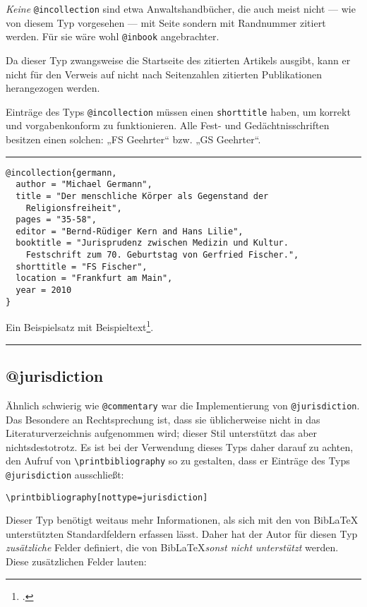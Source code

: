 \documentclass[11pt,a4paper,DIV=calc]{scrartcl}
\newcommand\software[1]{\textsf{#1}}
\newcommand\Biblatex{\software{Bib\LaTeX{}}\xspace}
\newenvironment{rubexample}{\par\vspace{\baselineskip}\hrule\par\begin{refsection}}{\end{refsection}\par\hrule\par\vspace{\baselineskip}}
\begin{document}
\emph{Keine} \verb+@incollection+ sind etwa Anwaltshandbücher, die
auch meist nicht — wie von diesem Typ vorgesehen — mit Seite sondern
mit Randnummer zitiert werden. Für sie wäre wohl \verb+@inbook+
angebrachter.

Da dieser Typ zwangsweise die Startseite des zitierten Artikels
ausgibt, kann er nicht für den Verweis auf nicht nach Seitenzahlen
zitierten Publikationen herangezogen werden.

Einträge des Typs \verb+@incollection+ müssen einen \verb+shorttitle+
haben, um korrekt und vorgabenkonform zu funktionieren. Alle Fest- und
Gedächtnisschriften besitzen einen solchen: „FS Geehrter“ bzw. „GS
Geehrter“.

\begin{rubexample}
\begin{verbatim}
@incollection{germann,
  author = "Michael Germann",
  title = "Der menschliche Körper als Gegenstand der
    Religionsfreiheit",
  pages = "35-58",
  editor = "Bernd-Rüdiger Kern and Hans Lilie",
  booktitle = "Jurisprudenz zwischen Medizin und Kultur.
    Festschrift zum 70. Geburtstag von Gerfried Fischer.",
  shorttitle = "FS Fischer",
  location = "Frankfurt am Main",
  year = 2010
}
\end{verbatim}

Ein Beispielsatz mit Beispieltext\footcite[41]{germann}.

\printbibliography
\end{rubexample}

\subsection{@jurisdiction}

Ähnlich schwierig wie \verb+@commentary+ war die Implementierung von
\verb+@jurisdiction+. Das Besondere an Rechtsprechung ist, dass sie
üblicherweise nicht in das Literaturverzeichnis aufgenommen wird;
dieser Stil unterstützt das aber nichtsdestotrotz. Es ist bei der
Verwendung dieses Typs daher darauf zu achten, den Aufruf von
\verb+\printbibliography+ so zu gestalten, dass er Einträge des Typs
\verb+@jurisdiction+ ausschließt:

\begin{verbatim}
\printbibliography[nottype=jurisdiction]
\end{verbatim}

Dieser Typ benötigt weitaus mehr Informationen, als sich mit den von
\Biblatex unterstützten Standardfeldern erfassen lässt. Daher hat der
Autor für diesen Typ \emph{zusätzliche} Felder definiert, die von
\Biblatex \emph{sonst nicht unterstützt} werden. Diese zusätzlichen
Felder lauten:
\end{document}
